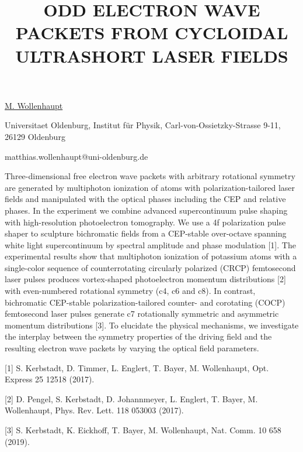 \title{ODD ELECTRON WAVE PACKETS FROM CYCLOIDAL ULTRASHORT LASER FIELDS}

\underline{M. Wollenhaupt}  

{\normalsize{\vspace{-4mm}
Universitaet Oldenburg,
Institut f\"ur Physik,
Carl-von-Ossietzky-Strasse 9-11,
26129 Oldenburg




\email matthias.wollenhaupt@uni-oldenburg.de}}

Three-dimensional free electron wave packets with arbitrary rotational symmetry are generated by multiphoton ionization of atoms with polarization-tailored laser fields and manipulated with the optical phases including the CEP and relative phases. In the experiment we combine advanced supercontinuum pulse shaping with high-resolution photoelectron tomography. We use a 4f polarization pulse shaper to sculpture bichromatic fields from a CEP-stable over-octave spanning white light supercontinuum by spectral amplitude and phase modulation [1]. The experimental results show that multiphoton ionization of potassium atoms with a single-color sequence of counterrotating circularly polarized (CRCP) femtosecond laser pulses produces vortex-shaped photoelectron momentum distributions [2] with even-numbered rotational symmetry (c4, c6 and c8). In contrast, bichromatic CEP-stable polarization-tailored counter- and corotating (COCP) femtosecond laser pulses generate c7 rotationally symmetric and asymmetric momentum distributions [3]. To elucidate the physical mechanisms, we investigate the interplay between the symmetry properties of the driving field and the resulting electron wave packets by varying the optical field parameters.

{\normalsize
[1] S. Kerbstadt, D. Timmer, L. Englert, T. Bayer, M. Wollenhaupt, Opt. Express 25 12518 (2017).
\vsp

[2] D. Pengel, S. Kerbstadt, D. Johannmeyer, L. Englert, T. Bayer, M. Wollenhaupt, Phys. Rev. Lett. 118 053003 (2017).
\vsp

[3] S. Kerbstadt, K. Eickhoff, T. Bayer, M. Wollenhaupt, Nat. Comm. 10 658 (2019).
}

\vspace{\baselineskip}

